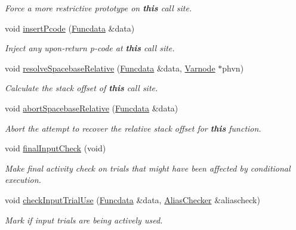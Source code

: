 \begin{DoxyCompactItemize}
\begin{DoxyCompactList}\small\item\em Force a more restrictive prototype on {\bfseries{this}} call site. \end{DoxyCompactList}\item 
void \mbox{\hyperlink{class_func_call_specs_aae6a890aaa82deca59ec7c57c92629aa}{insert\+Pcode}} (\mbox{\hyperlink{class_funcdata}{Funcdata}} \&data)
\begin{DoxyCompactList}\small\item\em Inject any {\itshape upon-\/return} p-\/code at {\bfseries{this}} call site. \end{DoxyCompactList}\item 
void \mbox{\hyperlink{class_func_call_specs_a5ad2a3f374049dec6fdf0f9d20295305}{resolve\+Spacebase\+Relative}} (\mbox{\hyperlink{class_funcdata}{Funcdata}} \&data, \mbox{\hyperlink{class_varnode}{Varnode}} $\ast$phvn)
\begin{DoxyCompactList}\small\item\em Calculate the stack offset of {\bfseries{this}} call site. \end{DoxyCompactList}\item 
void \mbox{\hyperlink{class_func_call_specs_ad3c3231b5c523e491d65f31ddb688cc1}{abort\+Spacebase\+Relative}} (\mbox{\hyperlink{class_funcdata}{Funcdata}} \&data)
\begin{DoxyCompactList}\small\item\em Abort the attempt to recover the relative stack offset for {\bfseries{this}} function. \end{DoxyCompactList}\item 
void \mbox{\hyperlink{class_func_call_specs_a48998cb808c1feedcad257f0984317ed}{final\+Input\+Check}} (void)
\begin{DoxyCompactList}\small\item\em Make final activity check on trials that might have been affected by conditional execution. \end{DoxyCompactList}\item 
void \mbox{\hyperlink{class_func_call_specs_ab49917128896eb002c816e361f875943}{check\+Input\+Trial\+Use}} (\mbox{\hyperlink{class_funcdata}{Funcdata}} \&data, \mbox{\hyperlink{class_alias_checker}{Alias\+Checker}} \&aliascheck)
\begin{DoxyCompactList}\small\item\em Mark if input trials are being actively used. \end{DoxyCompactList}\item 

\end{DoxyCompactItemize}
